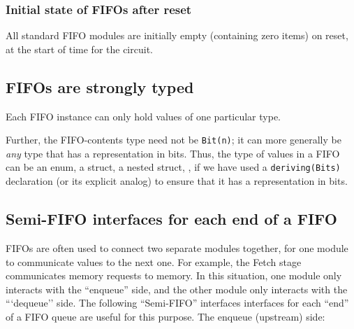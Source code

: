 \vspace{2ex}


\subsubsection{Initial state of FIFOs after reset}

\label{Sec_FIFO_initial_state}

All standard {\BSV} FIFO modules are initially empty (containing zero
items) on reset, {\ie} at the start of time for the circuit.


\subsection{FIFOs are strongly typed}


Each {\BSV} FIFO instance can only hold values of one particular type.

Further, the FIFO-contents type need not be \verb|Bit(n)|; it can more
generally be \emph{any} {\BSV} type that has a representation in bits.
Thus, the type of values in a FIFO can be an enum, a struct, a nested
struct, {\etc}, if we have used a \verb|deriving(Bits)| declaration
(or its explicit analog) to ensure that it has a representation in
bits.


\subsection{Semi-FIFO interfaces for each end of a FIFO}

\label{Sec_Semi_FIFOs}

FIFOs are often used to connect two separate modules together, for one
module to communicate values to the next one.  For example, the Fetch
stage communicates memory requests to memory.  In this situation, one
module only interacts with the ``enqueue'' side, and the other module
only interacts with the ```dequeue'' side.  The following
``Semi-FIFO'' interfaces interfaces for each ``end'' of a FIFO queue
are useful for this purpose.  The enqueue (upstream) side:


